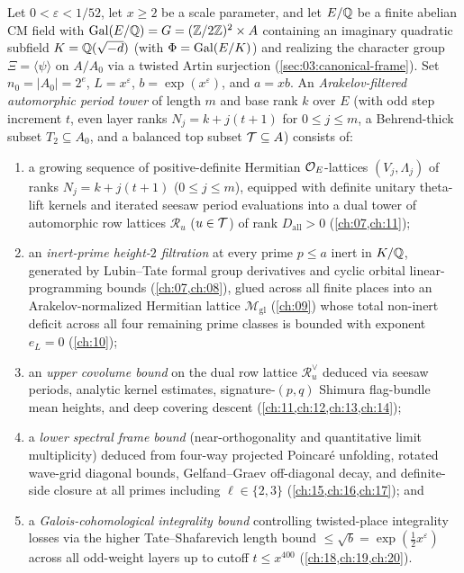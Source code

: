 \begin{definition}
\label{def:01:period-tower}
Let $0 < \varepsilon < 1/52$, let $x \ge 2$ be a scale parameter, and let $E/\mathbb{Q}$ be a finite abelian CM field with $\mathrm{Gal}(E/\mathbb{Q}) = G = (\mathbb{Z}/2\mathbb{Z})^2 \times A$ containing an imaginary quadratic subfield $K = \mathbb{Q}(\sqrt{-d})$ (with $\Phi = \mathrm{Gal}(E/K)$) and realizing the character group $\Xi = \langle \psi \rangle$ on $A / A_0$ via a twisted Artin surjection (\cref{sec:03:canonical-frame}). Set $n_0 = |A_0| = 2^e$, $L = x^\varepsilon$, $b = \exp(x^\varepsilon)$, and $a = x b$. An \emph{Arakelov-filtered automorphic period tower} of length $m$ and base rank $k$ over $E$ (with odd step increment $t$, even layer ranks $N_j = k + j(t+1)$ for $0 \le j \le m$, a Behrend-thick subset $T_2 \subseteq A_0$, and a balanced top subset $\mathcal{T} \subseteq A$) consists of:
\begin{enumerate}[label=\textup{(\roman*)}]
\item a growing sequence of positive-definite Hermitian $\mathcal{O}_E$-lattices $(V_j, \Lambda_j)$ of ranks $N_j = k + j(t+1)$ ($0 \le j \le m$), equipped with definite unitary theta-lift kernels and iterated seesaw period evaluations into a dual tower of automorphic row lattices $\mathcal{R}_u$ ($u \in \mathcal{T}$) of rank $D_{\mathrm{all}} > 0$ (\cref{ch:07,ch:11});
\item an \emph{inert-prime height-$2$ filtration} at every prime $p \le a$ inert in $K/\mathbb{Q}$, generated by Lubin--Tate formal group derivatives and cyclic orbital linear-programming bounds (\cref{ch:07,ch:08}), glued across all finite places into an Arakelov-normalized Hermitian lattice $\mathcal{M}_{\mathrm{gl}}$ (\cref{ch:09}) whose total non-inert deficit across all four remaining prime classes is bounded with exponent $e_L = 0$ (\cref{ch:10});
\item an \emph{upper covolume bound} on the dual row lattice $\mathcal{R}_u^\vee$ deduced via seesaw periods, analytic kernel estimates, signature-$(p,q)$ Shimura flag-bundle mean heights, and deep covering descent (\cref{ch:11,ch:12,ch:13,ch:14});
\item a \emph{lower spectral frame bound} (near-orthogonality and quantitative limit multiplicity) deduced from four-way projected Poincar\'e unfolding, rotated wave-grid diagonal bounds, Gelfand--Graev off-diagonal decay, and definite-side closure at all primes including $\ell \in \{2,3\}$ (\cref{ch:15,ch:16,ch:17}); and
\item a \emph{Galois-cohomological integrality bound} controlling twisted-place integrality losses via the higher Tate--Shafarevich length bound $\le \sqrt{b} = \exp(\frac{1}{2}x^\varepsilon)$ across all odd-weight layers up to cutoff $t \le x^{400}$ (\cref{ch:18,ch:19,ch:20}).
\end{enumerate}
\end{definition}

